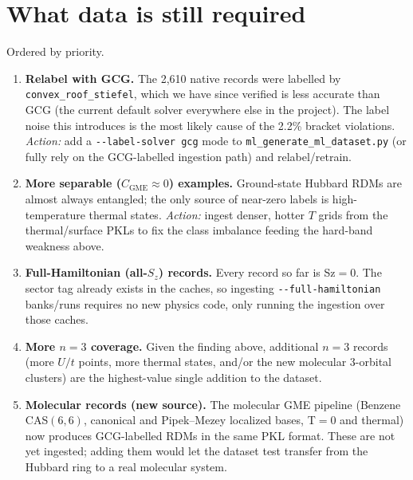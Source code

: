 \documentclass[11pt]{article}
\newcommand{\code}[1]{\texttt{\small #1}}
\newcommand{\CGME}{\ensuremath{C_{\mathrm{GME}}}}
\begin{document}
\section{What data is still required}\label{sec:gaps}
Ordered by priority.
\begin{enumerate}[nosep]
  \item \textbf{Relabel with GCG.} The 2{,}610 native records were labelled by
        \code{convex\_roof\_stiefel}, which we have since verified is less
        accurate than GCG (the current default solver everywhere else in the
        project). The label noise this introduces is the most likely cause of
        the 2.2\% bracket violations. \emph{Action:} add a
        \code{-{}-label-solver gcg} mode to \code{ml\_generate\_ml\_dataset.py}
        (or fully rely on the GCG-labelled ingestion path) and relabel/retrain.
  \item \textbf{More separable ($\CGME{}\approx0$) examples.} Ground-state
        Hubbard RDMs are almost always entangled; the only source of
        near-zero labels is high-temperature thermal states. \emph{Action:}
        ingest denser, hotter $T$ grids from the thermal/surface PKLs to fix
        the class imbalance feeding the hard-band weakness above.
  \item \textbf{Full-Hamiltonian (all-$S_z$) records.} Every record so far is
        Sz$=0$. The sector tag already exists in the caches, so ingesting
        \code{-{}-full-hamiltonian} banks/runs requires no new physics code,
        only running the ingestion over those caches.
  \item \textbf{More $n=3$ coverage.} Given the finding above, additional
        $n=3$ records (more $U/t$ points, more thermal states, and/or the new
        molecular 3-orbital clusters) are the highest-value single addition to
        the dataset.
  \item \textbf{Molecular records (new source).} The molecular GME pipeline
        (Benzene CAS$(6,6)$, canonical and Pipek--Mezey localized bases, T$=0$
        and thermal) now produces GCG-labelled RDMs in the same PKL format.
        These are not yet ingested; adding them would let the dataset test
        transfer from the Hubbard ring to a real molecular system.
\end{enumerate}

\end{document}
